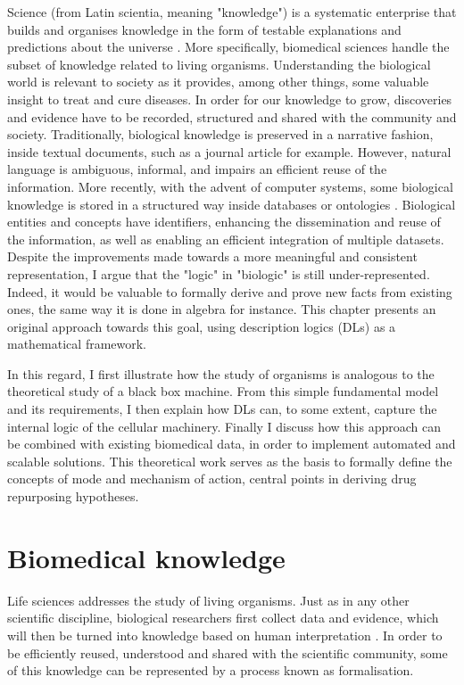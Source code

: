 Science (from Latin scientia, meaning "knowledge") is a systematic enterprise that builds and organises knowledge in the form of testable explanations and predictions about the universe \citep{sciencewiki}. More specifically, biomedical sciences handle the subset of knowledge related to living organisms. Understanding the biological world is relevant to society as it provides, among other things, some valuable insight to treat and cure diseases. In order for our knowledge to grow, discoveries and evidence have to be recorded, structured and shared with the community and society. Traditionally, biological knowledge is preserved in a narrative fashion, inside textual documents, such as a journal article for example. However, natural language is ambiguous, informal, and impairs an efficient reuse of the information. More recently, with the advent of computer systems, some biological knowledge is stored in a structured way inside databases or ontologies \citep{brooksbank2014european}. Biological entities and concepts have identifiers, enhancing the dissemination and reuse of the information, as well as enabling an efficient integration of multiple datasets. Despite the improvements made towards a more meaningful and consistent representation, I argue that the "logic" in "biologic" is still under-represented. Indeed, it would be valuable to formally derive and prove new facts from existing ones, the same way it is done in algebra for instance. This chapter presents an original approach towards this goal, using description logics (DLs) as a mathematical framework.

In this regard, I first illustrate how the study of organisms is analogous to the theoretical study of a black box machine. From this simple fundamental model and its requirements, I then explain how DLs can, to some extent, capture the internal logic of the cellular machinery. Finally I discuss how this approach can be combined with existing biomedical data, in order to implement automated and scalable solutions. This theoretical work serves as the basis to formally define the concepts of mode and mechanism of action, central points in deriving drug repurposing hypotheses.

\section{Biomedical knowledge}

Life sciences addresses the study of living organisms. Just as in any other scientific discipline, biological researchers first collect data and evidence, which will then be turned into knowledge based on human interpretation \citep{antezana2009biological}. In order to be efficiently reused, understood and shared with the scientific community, some of this knowledge can be represented by a process known as formalisation.

